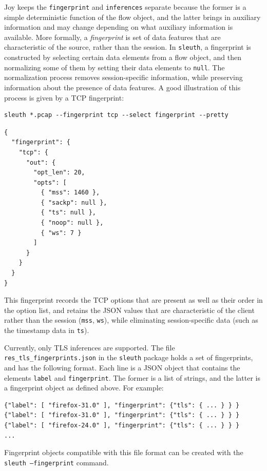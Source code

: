 \documentclass{book}
\begin{document}
Joy keeps the \texttt{fingerprint} and \texttt{inferences} separate
because the former is a simple deterministic function of the flow
object, and the latter brings in auxiliary information and may change
depending on what auxiliary information is available.  More
formally, a \textit{fingerprint} is set of data
features that are characteristic of the source, rather than the
session.  In \texttt{sleuth}, a fingerprint is constructed by
selecting certain data elements from a flow object, and then
normalizing some of them by setting their data elements to
\texttt{null}.  The normalization process removes session-specific
information, while preserving information about the presence of data
features.  A good illustration of this process is given by a TCP
fingerprint:
\begin{mdframed}[style=cli]
  \begin{verbatim}
sleuth *.pcap --fingerprint tcp --select fingerprint --pretty
  \end{verbatim}
\begin{verbatim}
{
  "fingerprint": {
    "tcp": {
      "out": {
        "opt_len": 20,
        "opts": [
          { "mss": 1460 },
          { "sackp": null },
          { "ts": null },
          { "noop": null },
          { "ws": 7 }
        ]
      }
    }
  }
}
\end{verbatim}
\end{mdframed}
This fingerprint records the TCP options that are present as well as
their order in the option list, and retains the JSON values that are
characteristic of the client rather than the session (\texttt{mss},
\texttt{ws}), while eliminating session-specific data (such as
the timestamp data in \texttt{ts}).  

Currently, only TLS inferences are supported.  The file
\texttt{res\_tls\_fingerprints.json} in the \texttt{sleuth} package
holds a set of fingerprints, and has the following format.  Each line
is a JSON object that contains the elements \texttt{label} and \texttt{fingerprint}.
The former is a list of strings, and the latter is a fingerprint object
as defined above.  For example:
\begin{mdframed}[style=cli]
\begin{verbatim}
{"label": [ "firefox-31.0" ], "fingerprint": {"tls": { ... } } }
{"label": [ "firefox-31.0" ], "fingerprint": {"tls": { ... } } } 
{"label": [ "firefox-24.0" ], "fingerprint": {"tls": { ... } } }
...
\end{verbatim}
\end{mdframed}
Fingerprint objects compatible with this file format can be created
with the \texttt{sleuth --fingerprint} command.
\end{document}
